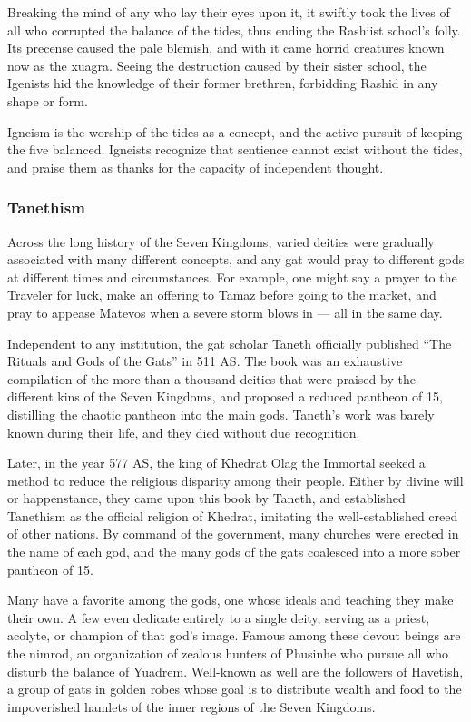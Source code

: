 Breaking the mind of any who lay their eyes upon it, it swiftly took the lives of all who corrupted the balance of the tides, thus ending the Rashiist school's folly.
Its precense caused the pale blemish, and with it came horrid creatures known now as the xuagra.
Seeing the destruction caused by their sister school, the Igenists hid the knowledge of their former brethren, forbidding Rashid in any shape or form.

Igneism is the worship of the tides as a concept, and the active pursuit of keeping the five balanced.
Igneists recognize that sentience cannot exist without the tides, and praise them as thanks for the capacity of independent thought.

\subsubsection{Tanethism}
Across the long history of the Seven Kingdoms, varied deities were gradually associated with many different concepts, and any gat would pray to different gods at different times and circumstances.
For example, one might say a prayer to the Traveler for luck, make an offering to Tamaz before going to the market, and pray to appease Matevos when a severe storm blows in --- all in the same day.

Independent to any institution, the gat scholar Taneth officially published ``The Rituals and Gods of the Gats'' in 511 AS.
The book was an exhaustive compilation of the more than a thousand deities that were praised by the different kins of the Seven Kingdoms, and proposed a reduced pantheon of 15, distilling the chaotic pantheon into the main gods.
Taneth's work was barely known during their life, and they died without due recognition.

Later, in the year 577 AS, the king of Khedrat Olag the Immortal seeked a method to reduce the religious disparity among their people.
Either by divine will or happenstance, they came upon this book by Taneth, and established Tanethism as the official religion of Khedrat, imitating the well-established creed of other nations.
By command of the government, many churches were erected in the name of each god, and the many gods of the gats coalesced into a more sober pantheon of 15.

Many have a favorite among the gods, one whose ideals and teaching they make their own.
A few even dedicate entirely to a single deity, serving as a priest, acolyte, or champion of that god's image.
Famous among these devout beings are the nimrod, an organization of zealous hunters of Phusinhe who pursue all who disturb the balance of Yuadrem.
Well-known as well are the followers of Havetish, a group of gats in golden robes whose goal is to distribute wealth and food to the impoverished hamlets of the inner regions of the Seven Kingdoms.

